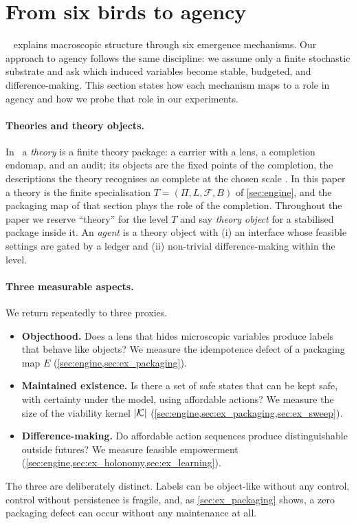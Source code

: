\section{From six birds to agency}
\label{sec:dictionary}

\SBT\ \citep{six_birds_theory} explains macroscopic structure through six emergence mechanisms. Our approach to agency follows the same discipline: we assume only a finite stochastic substrate and ask which induced variables become stable, budgeted, and difference-making. This section states how each mechanism maps to a role in agency and how we probe that role in our experiments.

\paragraph{Theories and theory objects.}
In \SBT\ a \emph{theory} is a finite theory package: a carrier with a lens, a completion endomap, and an audit; its objects are the fixed points of the completion, the descriptions the theory recognises as complete at the chosen scale \citep{six_birds_theory}. In this paper a theory is the finite specialisation $T=(\Pi,L,\mathcal{F},B)$ of \cref{sec:engine}, and the packaging map of that section plays the role of the completion. Throughout the paper we reserve ``theory'' for the level $T$ and say \emph{theory object} for a stabilised package inside it. An \emph{agent} is a theory object with (i) an interface whose feasible settings are gated by a ledger and (ii) non-trivial difference-making within the level.

\paragraph{Three measurable aspects.}
We return repeatedly to three proxies.
\begin{itemize}[leftmargin=*, itemsep=0.25em]
  \item \textbf{Objecthood.} Does a lens that hides microscopic variables produce labels that behave like objects? We measure the idempotence defect of a packaging map $E$ (\cref{sec:engine,sec:ex_packaging}).
  \item \textbf{Maintained existence.} Is there a set of safe states that can be kept safe, with certainty under the model, using affordable actions? We measure the size of the viability kernel $|\mathcal{K}|$ (\cref{sec:engine,sec:ex_packaging,sec:ex_sweep}).
  \item \textbf{Difference-making.} Do affordable action sequences produce distinguishable outside futures? We measure feasible empowerment (\cref{sec:engine,sec:ex_holonomy,sec:ex_learning}).
\end{itemize}
The three are deliberately distinct. Labels can be object-like without any control, control without persistence is fragile, and, as \cref{sec:ex_packaging} shows, a zero packaging defect can occur without any maintenance at all.

